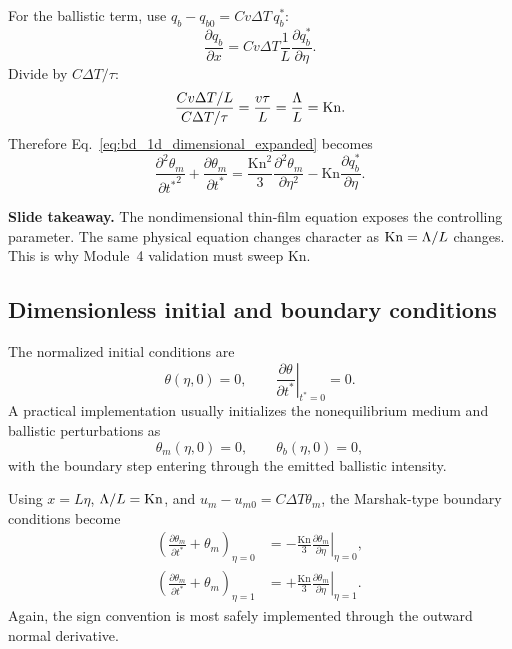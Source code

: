 \documentclass[11pt]{article}
\begin{document}
For the ballistic term, use \(q_b-q_{b0}=C v\Delta T\,q_b^*\):
\begin{equation}
    \frac{\partial q_b}{\partial x}
    =C v\Delta T\frac{1}{L}\frac{\partial q_b^*}{\partial\eta}.
\end{equation}
Divide by \(C\Delta T/\tau\):
\begin{equation}
    \frac{C v\Delta T/L}{C\Delta T/\tau}
    =\frac{v\tau}{L}=\frac{\Lambda}{L}=\mathrm{Kn}.
\end{equation}
Therefore Eq.~\eqref{eq:bd_1d_dimensional_expanded} becomes
\begin{equation}
    \boxed{
    \frac{\partial^2\theta_m}{\partial {t^*}^2}
    +\frac{\partial\theta_m}{\partial t^*}
    =\frac{\mathrm{Kn}^2}{3}\frac{\partial^2\theta_m}{\partial\eta^2}
    -\mathrm{Kn}\frac{\partial q_b^*}{\partial\eta}.}
    \label{eq:bd_1d_dimensionless_expanded}
\end{equation}

\begin{notebox}
\textbf{Slide takeaway.} The nondimensional thin-film equation exposes the controlling parameter. The same physical equation changes character as \(\mathrm{Kn}=\Lambda/L\) changes. This is why Module~4 validation must sweep \(\mathrm{Kn}\).
\end{notebox}

\subsection{Dimensionless initial and boundary conditions}
The normalized initial conditions are
\begin{equation}
    \theta(\eta,0)=0,
    \qquad
    \left.\frac{\partial\theta}{\partial t^*}\right|_{t^*=0}=0.
\end{equation}
A practical implementation usually initializes the nonequilibrium medium and ballistic perturbations as
\begin{equation}
    \theta_m(\eta,0)=0,
    \qquad
    \theta_b(\eta,0)=0,
\end{equation}
with the boundary step entering through the emitted ballistic intensity.

Using \(x=L\eta\), \(\Lambda/L=\mathrm{Kn}\), and \(u_m-u_{m0}=C\Delta T\theta_m\), the Marshak-type boundary conditions become
\begin{align}
    \left(\frac{\partial\theta_m}{\partial t^*}+\theta_m\right)_{\eta=0}
    &= -\frac{\mathrm{Kn}}{3}
    \left.\frac{\partial\theta_m}{\partial\eta}\right|_{\eta=0},\label{eq:left_bc_nd}\\
    \left(\frac{\partial\theta_m}{\partial t^*}+\theta_m\right)_{\eta=1}
    &= +\frac{\mathrm{Kn}}{3}
    \left.\frac{\partial\theta_m}{\partial\eta}\right|_{\eta=1}.\label{eq:right_bc_nd}
\end{align}
Again, the sign convention is most safely implemented through the outward normal derivative.
\end{document}
